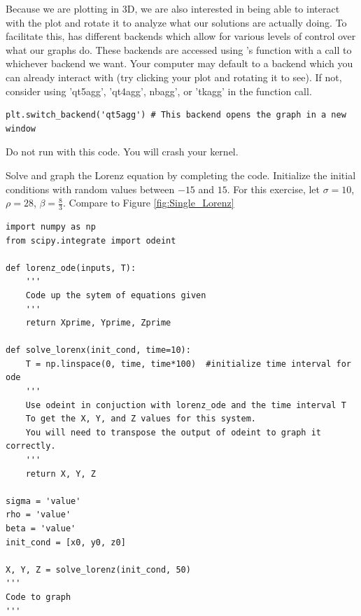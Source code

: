 Because we are plotting in 3D, we are also interested in being able to interact with the plot and rotate it to analyze what our solutions are actually doing.
To facilitate this,  has different backends which allow for various levels of control over what our graphs do.
These backends are accessed using 's  function with a call to whichever backend we want.
Your computer may default to a backend which you can already interact with (try clicking your plot and rotating it to see).
If not, consider using 'qt5agg', 'qt4agg', nbagg', or 'tkagg' in the function call.

\begin{lstlisting}
plt.switch_backend('qt5agg') # This backend opens the graph in a new window
\end{lstlisting}

\begin{warn}
Do not run  with this code. You will crash your kernel.
\end{warn}

\begin{problem}
Solve and graph the Lorenz equation by completing the code.
Initialize the initial conditions with random values between $-15$ and $15$.
For this exercise, let $\sigma=10$, $\rho=28$, $\beta=\frac{8}{3}$.
Compare to Figure \ref{fig:Single_Lorenz}
\begin{lstlisting}
import numpy as np
from scipy.integrate import odeint

def lorenz_ode(inputs, T):
	'''
	Code up the sytem of equations given
	'''
	return Xprime, Yprime, Zprime

def solve_lorenx(init_cond, time=10):
	T = np.linspace(0, time, time*100)	#initialize time interval for ode
	'''
	Use odeint in conjuction with lorenz_ode and the time interval T
	To get the X, Y, and Z values for this system.
	You will need to transpose the output of odeint to graph it correctly.
	'''
 	return X, Y, Z

sigma = 'value'
rho = 'value'
beta = 'value'
init_cond = [x0, y0, z0]

X, Y, Z = solve_lorenz(init_cond, 50)
'''
Code to graph
'''
\end{lstlisting}

\end{problem}


